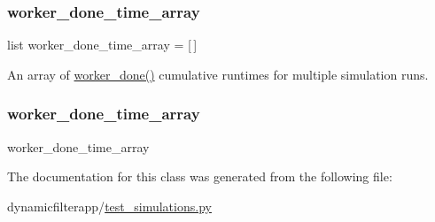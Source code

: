 \subsubsection{\texorpdfstring{worker\+\_\+done\+\_\+time\+\_\+array}{worker\_done\_time\_array}\hspace{0.1cm}{\footnotesize\ttfamily [1/2]}}
{\footnotesize\ttfamily list worker\+\_\+done\+\_\+time\+\_\+array = \mbox{[}$\,$\mbox{]}\hspace{0.3cm}{\ttfamily [static]}}



An array of \hyperlink{namespacedynamicfilterapp_1_1views__helpers_af27860dfe5bfa6b2b8a1b29347eb918d}{worker\+\_\+done()} cumulative runtimes for multiple simulation runs. 

\mbox{\label{classdynamicfilterapp_1_1test__simulations_1_1_simulation_test_a680da985b1b53b139f765033ec8a59ae}} 
\subsubsection{\texorpdfstring{worker\+\_\+done\+\_\+time\+\_\+array}{worker\_done\_time\_array}\hspace{0.1cm}{\footnotesize\ttfamily [2/2]}}
{\footnotesize\ttfamily worker\+\_\+done\+\_\+time\+\_\+array}



The documentation for this class was generated from the following file\+:\begin{DoxyCompactItemize}
\item 
dynamicfilterapp/\hyperlink{test__simulations_8py}{test\+\_\+simulations.\+py}\end{DoxyCompactItemize}
